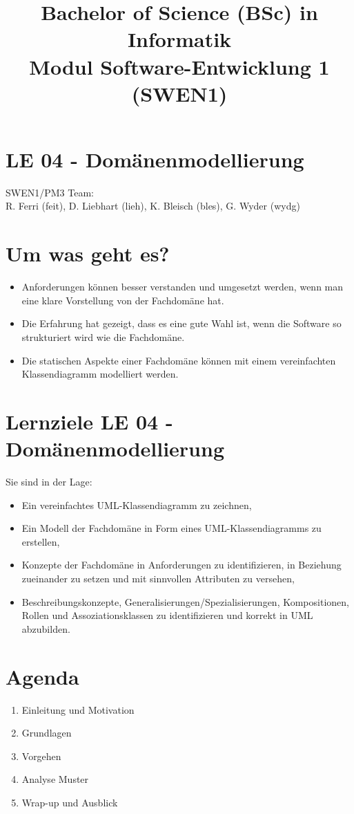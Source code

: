 \documentclass[10pt]{article}
\title{Bachelor of Science (BSc) in Informatik \\
 Modul Software-Entwicklung 1 (SWEN1) }
\author{}
\date{}
\begin{document}
\maketitle
\section*{LE 04 - Domänenmodellierung}
SWEN1/PM3 Team:\\
R. Ferri (feit), D. Liebhart (lieh), K. Bleisch (bles), G. Wyder (wydg)

\section*{Um was geht es?}
\begin{itemize}
  \item Anforderungen können besser verstanden und umgesetzt werden, wenn man eine klare Vorstellung von der Fachdomäne hat.
  \item Die Erfahrung hat gezeigt, dass es eine gute Wahl ist, wenn die Software so strukturiert wird wie die Fachdomäne.
  \item Die statischen Aspekte einer Fachdomäne können mit einem vereinfachten Klassendiagramm modelliert werden.
\end{itemize}

\section*{Lernziele LE 04 - Domänenmodellierung}
Sie sind in der Lage:

\begin{itemize}
  \item Ein vereinfachtes UML-Klassendiagramm zu zeichnen,
  \item Ein Modell der Fachdomäne in Form eines UML-Klassendiagramms zu erstellen,
  \item Konzepte der Fachdomäne in Anforderungen zu identifizieren, in Beziehung zueinander zu setzen und mit sinnvollen Attributen zu versehen,
  \item Beschreibungskonzepte, Generalisierungen/Spezialisierungen, Kompositionen, Rollen und Assoziationsklassen zu identifizieren und korrekt in UML abzubilden.
\end{itemize}

\section*{Agenda}
\begin{enumerate}
  \item Einleitung und Motivation
  \item Grundlagen
  \item Vorgehen
  \item Analyse Muster
  \item Wrap-up und Ausblick
\end{enumerate}
\end{document}
